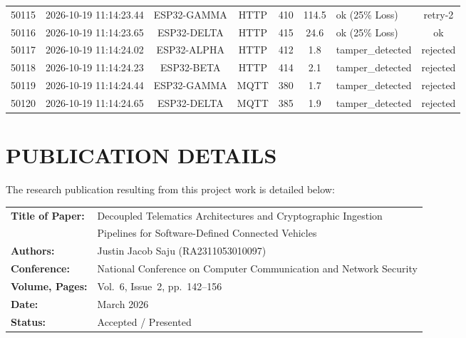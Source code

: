 \documentclass[12pt,a4paper]{report}
\begin{document}
\begin{table}[H]
\begin{tabularx}{\textwidth}{l c c c c c >{\raggedright\arraybackslash}X c}
50115 & 2026-10-19 11:14:23.44 & ESP32-GAMMA & HTTP & 410 & 114.5 & ok (25\% Loss) & retry-2 \\
50116 & 2026-10-19 11:14:23.65 & ESP32-DELTA & HTTP & 415 & 24.6 & ok (25\% Loss) & ok \\
50117 & 2026-10-19 11:14:24.02 & ESP32-ALPHA & HTTP & 412 & 1.8 & tamper\_detected & rejected \\
50118 & 2026-10-19 11:14:24.23 & ESP32-BETA  & HTTP & 414 & 2.1 & tamper\_detected & rejected \\
50119 & 2026-10-19 11:14:24.44 & ESP32-GAMMA & MQTT & 380 & 1.7 & tamper\_detected & rejected \\
50120 & 2026-10-19 11:14:24.65 & ESP32-DELTA & MQTT & 385 & 1.9 & tamper\_detected & rejected \\
\bottomrule
\end{tabularx}
\end{table}

\chapter*{PUBLICATION DETAILS}

The research publication resulting from this project work is detailed below:

\vspace{1cm}
\noindent\begin{tabularx}{\textwidth}{ll}
\textbf{Title of Paper:} & Decoupled Telematics Architectures and Cryptographic Ingestion \\
                         & Pipelines for Software-Defined Connected Vehicles \\[0.4cm]
\textbf{Authors:}        & Justin Jacob Saju (RA2311053010097) \\[0.4cm]
\textbf{Conference:}     & National Conference on Computer Communication and Network Security \\[0.4cm]
\textbf{Volume, Pages:}  & Vol.~6, Issue~2, pp.~142--156 \\[0.4cm]
\textbf{Date:}           & March 2026 \\[0.4cm]
\textbf{Status:}         & Accepted / Presented \\
\end{tabularx}
\end{document}
